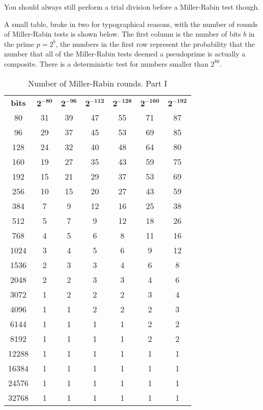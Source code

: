 \documentclass[synpaper]{book}
\begin{document}
You should always still perform a trial division before a Miller-Rabin test though.

A small table, broke in two for typographical reasons, with the number of rounds of Miller-Rabin tests is shown below.
The first column is the number of bits $b$ in the prime $p = 2^b$, the numbers in the first row represent the
probability that the number that all of the Miller-Rabin tests deemed a pseudoprime is actually a composite. There is a deterministic test for numbers smaller than $2^{80}$.

\begin{table}[h]
\begin{center}
\begin{tabular}{c c c c c c c}
\textbf{bits} & $\mathbf{2^{-80}}$ & $\mathbf{2^{-96}}$ & $\mathbf{2^{-112}}$ & $\mathbf{2^{-128}}$ & $\mathbf{2^{-160}}$ & $\mathbf{2^{-192}}$ \\
80    & 31 & 39 & 47 & 55 & 71 & 87  \\
96    & 29 & 37 & 45 & 53 & 69 & 85  \\
128   & 24 & 32 & 40 & 48 & 64 & 80  \\
160   & 19 & 27 & 35 & 43 & 59 & 75  \\
192   & 15 & 21 & 29 & 37 & 53 & 69  \\
256   & 10 & 15 & 20 & 27 & 43 & 59  \\
384   & 7  & 9  & 12 & 16 & 25 & 38  \\
512   & 5  & 7  & 9  & 12 & 18 & 26  \\
768   & 4  & 5  & 6  & 8  & 11 & 16  \\
1024  & 3  & 4  & 5  & 6  & 9  & 12  \\
1536  & 2  & 3  & 3  & 4  & 6  & 8   \\
2048  & 2  & 2  & 3  & 3  & 4  & 6   \\
3072  & 1  & 2  & 2  & 2  & 3  & 4   \\
4096  & 1  & 1  & 2  & 2  & 2  & 3   \\
6144  & 1  & 1  & 1  & 1  & 2  & 2   \\
8192  & 1  & 1  & 1  & 1  & 2  & 2   \\
12288 & 1  & 1  & 1  & 1  & 1  & 1   \\
16384 & 1  & 1  & 1  & 1  & 1  & 1   \\
24576 & 1  & 1  & 1  & 1  & 1  & 1   \\
32768 & 1  & 1  & 1  & 1  & 1  & 1
\end{tabular}
\caption{ Number of Miller-Rabin rounds. Part I } \label{table:millerrabinrunsp1}
\end{center}
\end{table}
\end{document}
